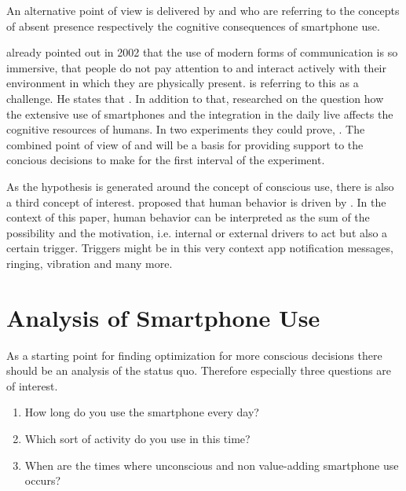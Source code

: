 An alternative point of view is delivered by \cite{Gergen.2002} and \cite{Ward.2017} who are referring to the concepts of absent presence respectively the cognitive consequences of smartphone use.
\begin{center}
 \autocite[][p.227]{Gergen.2002}
\end{center}
\cite{Gergen.2002} already pointed out in 2002 that the use of modern forms of communication is so immersive, that people do not pay attention to and interact actively with their environment in which they are physically present. \cite{Gergen.2002} is referring to this as a challenge. He states that \autocite[][p.236]{Gergen.2002}. In addition to that, \cite{Ward.2017} researched on the question how the extensive use of smartphones and the integration in the daily live affects the cognitive resources of humans. In two experiments they could prove,  \autocite[][]{Ward.2017}. The combined point of view of \cite{Gergen.2002} and \cite{Ward.2017} will be a basis for providing support to the concious decisions to make for the first interval of the experiment.

As the hypothesis is generated around the concept of conscious use, there is also a third concept of interest. \cite{Fogg.2015} proposed  \autocite{Fogg.2015} that human behavior is driven by  \autocite{Fogg.2015}. In the context of this paper, human behavior can be interpreted as the sum of the possibility and the motivation, i.e. internal or external drivers to act but also a certain trigger. Triggers might be in this very context app notification messages, ringing, vibration and many more. 


\section*{Analysis of Smartphone Use}
As a starting point for finding optimization for more conscious decisions there should be an analysis of the status quo. Therefore especially three questions are of interest. 
\begin{enumerate}
\item How long do you use the smartphone every day?
\item Which sort of activity do you use in this time?
\item When are the times where unconscious and non value-adding smartphone use occurs?
\end{enumerate}

